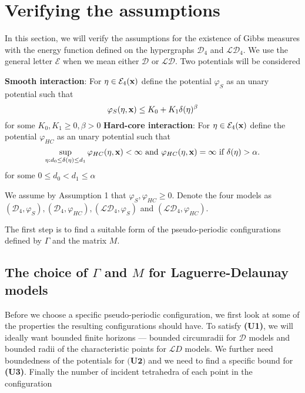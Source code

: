 \section{Verifying the assumptions}\label{sec:verifyassumptions}
In this section, we will verify the assumptions for the existence of Gibbs measures with the energy function defined on the hypergraphs $\mathcal D_4$ and $\mathcal {LD}_4$. We use the general letter $\mathcal E$ when we mean either $\mathcal D$ or $\mathcal {LD}$. Two potentials will be considered

\noindent \textbf{Smooth interaction}:  For $\eta\in\mathcal E_4({\mathbf{x}})$ define the potential $\varphi_S$ as an unary potential such that
$$\varphi_S(\eta,{\mathbf{x}}) \leq K_0 + K_1 \delta(\eta)^{\beta}$$
for some $K_0,K_1 \geq 0, \beta >0$\newline
\textbf{Hard-core interaction}: For $\eta\in\mathcal E_4({\mathbf{x}})$ define the potential $\varphi_{HC}$ as an unary potential such that
$$\sup_{\eta: d_0 \leq \delta(\eta) \leq d_1} \varphi_{HC}(\eta,{\mathbf{x}})  < \infty \text{ and } \varphi_{HC}(\eta,{\mathbf{x}})=\infty \text{ if } \delta(\eta)>\alpha.$$ 
for some $0\leq d_0 < d_1 \leq \alpha$ 

\noindent We assume by Assumption 1 that $\varphi_S,\varphi_{HC}\geq 0$. Denote the four models as $(\mathcal D_4,\varphi_{S}),(\mathcal D_4,\varphi_{HC}),(\mathcal {LD}_4,\varphi_{S})$ and $(\mathcal {LD}_4, \varphi_{HC})$. \newline

The first step is to find a suitable form of the pseudo-periodic configurations defined by $\Gamma$ and the matrix $M$. 

\subsection{The choice of $\Gamma$ and $M$ for Laguerre-Delaunay models}\label{sec:MGamma}
Before we choose a specific pseudo-periodic configuration, we first look at some of the properties the resulting configurations should have. To satisfy \textbf{(U1)}, we will ideally want bounded finite horizons --- bounded circumradii for $\mathcal D$ models and bounded radii of the characteristic points for $\mathcal LD$ models. We further need boundedness of the potentials for $\textbf{(U2)}$ and we need to find a specific bound for \textbf{(U3)}. Finally the number of incident tetrahedra of each point in the configuration 

